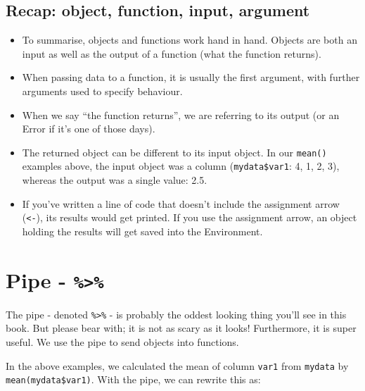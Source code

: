 \documentclass[
  12pt,
  krantz2]{krantz}
\makeatletter
\newenvironment{Shaded}{\begin{snugshade}}{\end{snugshade}}
\newcommand{\KeywordTok}[1]{\textcolor[rgb]{0.13,0.29,0.53}{\textbf{#1}}}
\newcommand{\NormalTok}[1]{#1}
\newcommand{\OperatorTok}[1]{\textcolor[rgb]{0.81,0.36,0.00}{\textbf{#1}}}
\newcommand{\StringTok}[1]{\textcolor[rgb]{0.31,0.60,0.02}{#1}}
\newenvironment{kframe}{%
\medskip{}
\setlength{\fboxsep}{.8em}
 \def\at@end@of@kframe{}%
 \ifinner\ifhmode%
  \def\at@end@of@kframe{\end{minipage}}%
  \begin{minipage}{\columnwidth}%
 \fi\fi%
 \def\FrameCommand##1{\hskip\@totalleftmargin \hskip-\fboxsep
 \colorbox{shadecolor}{##1}\hskip-\fboxsep
     \hskip-\linewidth \hskip-\@totalleftmargin \hskip\columnwidth}%
 \MakeFramed {\advance\hsize-\width
   \@totalleftmargin\z@ \linewidth\hsize
   \@setminipage}}%
 {\par\unskip\endMakeFramed%
 \at@end@of@kframe}
\renewenvironment{Shaded}{\begin{kframe}}{\end{kframe}}
\makeatother
\begin{document}
\hypertarget{recap-object-function-input-argument}{%
\subsection{Recap: object, function, input, argument}\label{recap-object-function-input-argument}}

\begin{itemize}
\item
  To summarise, objects and functions work hand in hand.
  Objects are both an input as well as the output of a function (what the function returns).
\item
  When passing data to a function, it is usually the first argument, with further arguments used to specify behaviour.
\item
  When we say ``the function returns'', we are referring to its output (or an Error if it's one of those days).
\item
  The returned object can be different to its input object.
  In our \texttt{mean()} examples above, the input object was a column (\texttt{mydata\$var1}: 4, 1, 2, 3), whereas the output was a single value: 2.5.
\item
  If you've written a line of code that doesn't include the assignment arrow (\texttt{\textless{}-}), its results would get printed.
  If you use the assignment arrow, an object holding the results will get saved into the Environment.
\end{itemize}

\hypertarget{pipe--}{%
\section{\texorpdfstring{Pipe - \texttt{\%\textgreater{}\%}}{Pipe - \%\textgreater\%}}\label{pipe--}}


The pipe - denoted \texttt{\%\textgreater{}\%} - is probably the oddest looking thing you'll see in this book.
But please bear with; it is not as scary as it looks!
Furthermore, it is super useful.
We use the pipe to send objects into functions.

In the above examples, we calculated the mean of column \texttt{var1} from \texttt{mydata} by \texttt{mean(mydata\$var1)}. With the pipe, we can rewrite this as:

\begin{Shaded}
\end{Shaded}
\end{document}
